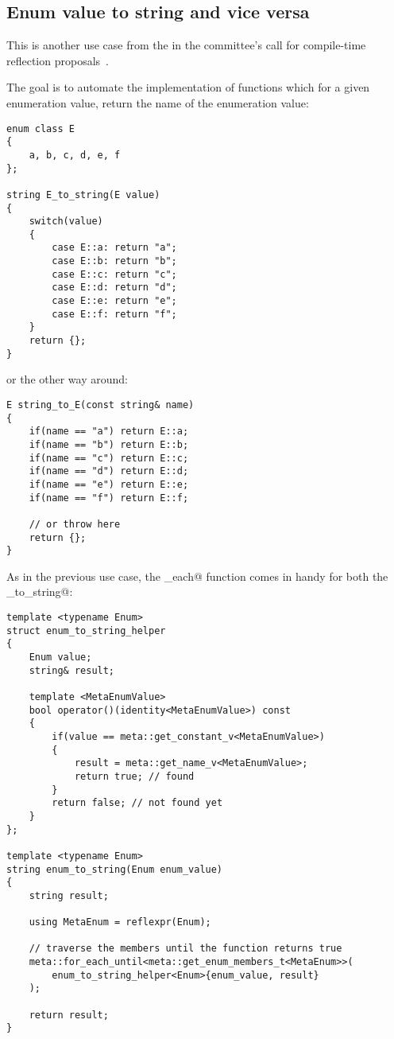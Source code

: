\subsection{Enum value to string and vice versa}

This is another use case from the  in the committee's
call for compile-time reflection proposals~\cite{ISOCPP-N3814}. 

The goal is to automate the implementation of functions which for a given
enumeration value, return the name of the enumeration value:

\begin{verbatim}
enum class E
{
	a, b, c, d, e, f
};

string E_to_string(E value)
{
	switch(value)
	{
		case E::a: return "a";
		case E::b: return "b";
		case E::c: return "c";
		case E::d: return "d";
		case E::e: return "e";
		case E::f: return "f";
	}
	return {};
}
\end{verbatim}

or the other way around:

\begin{verbatim}
E string_to_E(const string& name)
{
	if(name == "a") return E::a;
	if(name == "b") return E::b;
	if(name == "c") return E::c;
	if(name == "d") return E::d;
	if(name == "e") return E::e;
	if(name == "f") return E::f;

	// or throw here
	return {};
}
\end{verbatim}

As in the previous use case, the \verb@for_each@ function comes in handy
for both the \verb@enum_to_string@:

\begin{verbatim}
template <typename Enum>
struct enum_to_string_helper
{
	Enum value;
	string& result;

	template <MetaEnumValue>
	bool operator()(identity<MetaEnumValue>) const
	{
		if(value == meta::get_constant_v<MetaEnumValue>)
		{
			result = meta::get_name_v<MetaEnumValue>;
			return true; // found
		}
		return false; // not found yet
	}
};

template <typename Enum>
string enum_to_string(Enum enum_value)
{
	string result;

	using MetaEnum = reflexpr(Enum);

	// traverse the members until the function returns true
	meta::for_each_until<meta::get_enum_members_t<MetaEnum>>(
		enum_to_string_helper<Enum>{enum_value, result}
	);

	return result;
}
\end{verbatim}

